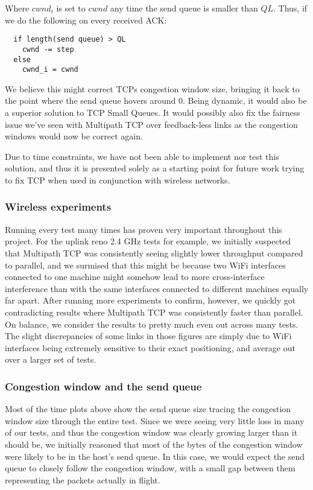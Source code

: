 Where $cwnd_i$ is set to $cwnd$ any time the send queue is smaller than $QL$.
Thus, if we do the following on every received ACK:

\begin{verbatim}
  if length(send queue) > QL
    cwnd -= step
  else
    cwnd_i = cwnd
\end{verbatim}

We believe this might correct TCPs congestion window size, bringing it back to
the point where the send queue hovers around 0. Being dynamic, it would also be
a superior solution to TCP Small Queues. It would possibly also fix the fairness
issue we've seen with Multipath TCP over feedback-less links as the congestion
windows would now be correct again.

Due to time constraints, we have not been able to implement nor test this
solution, and thus it is presented solely as a starting point for future work
trying to fix TCP when used in conjunction with wireless networks.

\subsubsection{Wireless experiments}
Running every test many times has proven very important throughout this project.
For the uplink reno 2.4 GHz tests for example, we initially suspected that
Multipath TCP was consistently seeing slightly lower throughput compared to
parallel, and we surmised that this might be because two WiFi interfaces
connected to one machine might somehow lead to more cross-interface interference
than with the same interfaces connected to different machines equally far apart.
After running more experiments to confirm, however, we quickly got contradicting
results where Multipath TCP was consistently faster than parallel. On balance,
we consider the results to pretty much even out across many tests. The slight
discrepancies of some links in those figures are simply due to WiFi interfaces
being extremely sensitive to their exact positioning, and average out over a
larger set of tests.

\subsubsection{Congestion window and the send queue}
Most of the time plots above show the send queue size tracing the congestion
window size through the entire test. Since we were seeing very  little loss in
many of our tests, and thus the congestion window was clearly growing larger
than it should be, we initially reasoned that most of the bytes of the
congestion window were likely to be in the host's send queue. In this case, we
would expect the send queue to closely follow the congestion window, with a
small gap between them representing the packets actually in flight.

